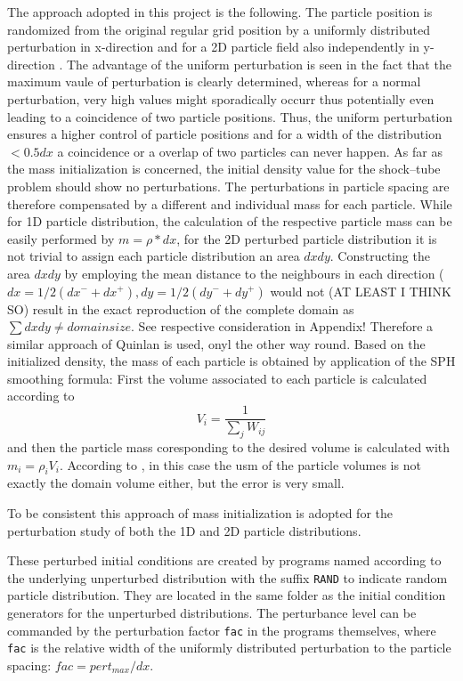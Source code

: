 \documentclass{report}
\begin{document}
 The approach adopted in this project is the following. The particle position is randomized from the original regular grid position by a uniformly distributed perturbation in x-direction and for a 2D particle field also independently in y-direction . The advantage of the uniform perturbation is seen in the fact that the maximum vaule of perturbation is clearly determined, whereas for a normal perturbation, very high values might sporadically occurr thus potentially even leading to a coincidence of two particle positions.                                             
 Thus, the uniform perturbation ensures a higher control of particle positions and for a width of the distribution $<0.5dx$ a coincidence or a overlap of two particles can never happen. As far as the mass initialization is concerned, the initial density value for the shock--tube problem should show no perturbations. The perturbations in particle spacing are therefore compensated by a different and individual mass for each particle. While for 1D particle distribution, the calculation of the respective particle mass can be easily performed by $m=\rho*dx$, for the 2D perturbed particle distribution it is not trivial to assign each particle distribution an area $dx dy$. Constructing the area $dx dy$ by employing the mean distance to the neighbours in each direction ($dx=1/2(dx^-+dx^+),dy=1/2(dy^-+dy^+)$ would not (AT LEAST I THINK SO) result in the exact reproduction of the complete domain as $\sum dxdy\neq domain size$. See respective consideration in Appendix!
 Therefore a similar approach of Quinlan \cite{Quinlan2006} is used, onyl the other way round. Based on the initialized density, the mass of each particle is obtained by application of the SPH smoothing formula: First the volume associated to each particle is calculated according to
 \begin{equation}
  V_i=\frac{1}{\sum_j W_{ij}}
 \end{equation}
 and then the particle mass coresponding to the desired volume is calculated with $m_i=\rho_i V_i$. According to \cite{Espanol2003}, in this case the usm of the particle volumes is not exactly the domain volume either, but the error is very small.

 To be consistent this approach of mass initialization is adopted for the perturbation study of both the 1D and 2D particle distributions.

 These perturbed initial conditions are created by programs named according to the underlying unperturbed distribution with the suffix {\tt RAND} to indicate random particle distribution. They are located in the same folder as the initial condition generators for the unperturbed distributions. The perturbance level can be commanded by the perturbation factor {\tt fac} in the programs themselves, where {\tt fac} is the relative width of the uniformly distributed perturbation to the particle spacing: $\mathit{fac}=\mathit{pert_{max}}/dx$.
\end{document}

